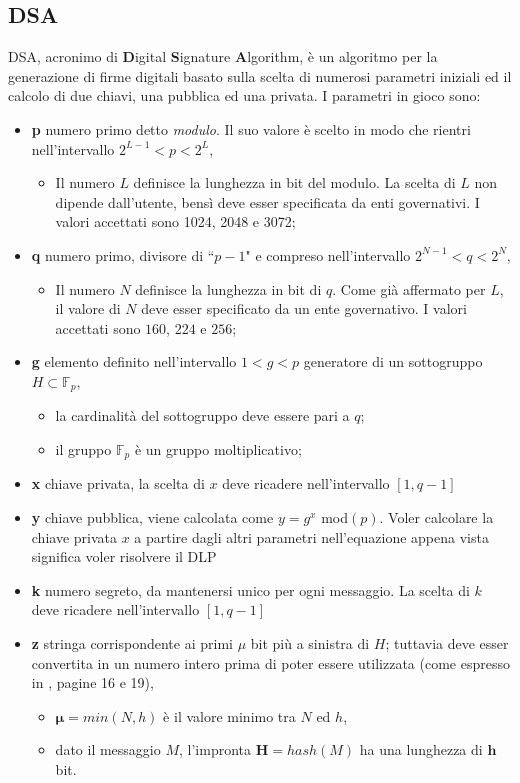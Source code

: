 \documentclass[a4paper,12pt]{tesiinfo}
\begin{document}
\subsection{DSA}
DSA, acronimo di \textbf{D}igital \textbf{S}ignature \textbf{A}lgorithm, \`e un algoritmo per la generazione di firme digitali \cite{dss} basato sulla scelta di numerosi parametri iniziali ed il calcolo di due chiavi, una pubblica ed una privata.
I parametri in gioco sono:
\begin{itemize}
 \item \textbf{p} numero primo detto \textit{modulo}. Il suo valore \`e scelto in modo che rientri nell'intervallo $2^{L-1}<p<2^L$,
    \begin{itemize}
     \item Il numero $L$ definisce la lunghezza in bit del modulo. La scelta di $L$ non dipende dall'utente, bens\`i deve esser specificata da enti governativi. I valori accettati sono 1024, 2048 e 3072;
    \end{itemize}
 \item \textbf{q} numero primo, divisore di ``$p-1$" e compreso nell'intervallo $2^{N-1}<q<2^N$,
    \begin{itemize}
     \item Il numero $N$ definisce la lunghezza in bit di $q$. Come gi\`a affermato per $L$, il valore di $N$ deve esser specificato da un ente governativo. I valori accettati sono $160$, $224$ e $256$;
    \end{itemize}
 \item \textbf{g} elemento definito nell'intervallo $1<g<p$ generatore di un sottogruppo $H \subset \mathbb{F}_p$,
 \begin{itemize}
  \item la cardinalit\`a del sottogruppo deve essere pari a $q$;
  \item il gruppo $\mathbb{F}_p$ \`e un gruppo moltiplicativo;
 \end{itemize}
  \item \textbf{x} chiave privata, la scelta di $x$ deve ricadere nell'intervallo $[1, q-1]$
 \item \textbf{y} chiave pubblica, viene calcolata come $y=g^x$ mod$(p)$. Voler calcolare la chiave privata $x$ a partire dagli altri parametri nell'equazione appena vista significa voler risolvere il DLP
 \item \textbf{k} numero segreto, da mantenersi unico per ogni messaggio. La scelta di $k$ deve ricadere nell'intervallo $[1, q-1]$
 \item \textbf{z} stringa corrispondente ai primi $\mu$ bit pi\`u a sinistra di $H$; tuttavia deve esser convertita in un numero intero prima di poter essere utilizzata (come espresso in \cite{dss}, pagine 16 e 19),
 \begin{itemize}
  \item $\mathbold{\mu} = min(N, h)$ \`e il valore minimo tra $N$ ed $h$,
  \item dato il messaggio $M$, l'impronta $\mathbold{H} = hash(M)$ ha una lunghezza di $\mathbold{h}$ bit.
 \end{itemize}
\end{itemize}
\end{document}
